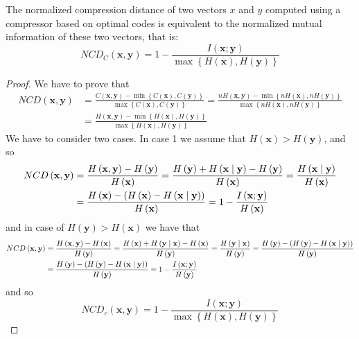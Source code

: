 \begin{proposition}
The normalized compression distance of two vectors $x$ and $y$ computed using a compressor based on optimal codes is equivalent to the normalized mutual information of these two vectors, that is:
\[
NCD_C\left(\mathbf{x},\mathbf{y}\right)=1-\frac{I\left(\mathbf{x};\mathbf{y}\right)}{\max\left\{ H\left(\mathbf{x}\right),H\left(\mathbf{y}\right)\right\} }
\]
\end{proposition}
\begin{proof}
We have to prove that
\begin{align*}
NCD\left(\mathbf{x},\mathbf{y}\right) & = \frac{C\left(\mathbf{x},\mathbf{y}\right)-\min\left\{ C\left(\mathbf{x}\right),C\left(\mathbf{y}\right)\right\} }{\max\left\{ C\left(\mathbf{x}\right),C\left(\mathbf{y}\right)\right\} } =\frac{nH\left(\mathbf{x},\mathbf{y}\right)-\min\left\{ nH\left(\mathbf{x}\right),nH\left(\mathbf{y}\right)\right\} }{\max\left\{ nH\left(\mathbf{x}\right),nH\left(\mathbf{y}\right)\right\} } \\
& =\frac{H\left(\mathbf{x},\mathbf{y}\right)-\min\left\{ H\left(\mathbf{x}\right),H\left(\mathbf{y}\right)\right\} }{\max\left\{ H\left(\mathbf{x}\right),H\left(\mathbf{y}\right)\right\} }
\end{align*}
We have to consider two cases. In case 1 we assume that $H\left(\mathbf{x}\right)>H\left(\mathbf{y}\right)$, and so
\begin{align*}
NCD\left(\mathbf{x},\mathbf{y}\right) & = \frac{H\left(\mathbf{x},\mathbf{y}\right)-H\left(\mathbf{y}\right)}{H\left(\mathbf{x}\right)} = \frac{H\left(\mathbf{y}\right)+H\left(\mathbf{x}\mid\mathbf{y}\right)-H\left(\mathbf{y}\right)}{H\left(\mathbf{x}\right)} = \frac{H\left(\mathbf{x}\mid\mathbf{y}\right)}{H\left(\mathbf{x}\right)} \\
& = \frac{H\left(\mathbf{x}\right)-\left(H\left(\mathbf{x}\right)-H\left(\mathbf{x}\mid\mathbf{y}\right)\right)}{H\left(\mathbf{x}\right)} = 1-\frac{I\left(\mathbf{x};\mathbf{y}\right)}{H\left(\text{\ensuremath{\mathbf{x}}}\right)}
\end{align*}
and in case of $H\left(\mathbf{y}\right)>H\left(\mathbf{x}\right)$ we have that
\begin{align*}
NCD\left(\mathbf{x},\mathbf{y}\right) & = \frac{H\left(\mathbf{x},\mathbf{y}\right)-H\left(\mathbf{x}\right)}{H\left(\mathbf{y}\right)} =\frac{H\left(\mathbf{x}\right)+H\left(\mathbf{y}\mid\mathbf{x}\right)-H\left(\mathbf{x}\right)}{H\left(\mathbf{y}\right)} = \frac{H\left(\mathbf{y}\mid\mathbf{x}\right)}{H\left(\mathbf{y}\right)}=\frac{H\left(\mathbf{y}\right)-\left(H\left(\mathbf{y}\right)-H\left(\mathbf{x}\mid\mathbf{y}\right)\right)}{H\left(\mathbf{y}\right)} \\
& = \frac{H\left(\mathbf{y}\right)-\left(H\left(\mathbf{y}\right)-H\left(\mathbf{x}\mid\mathbf{y}\right)\right)}{H\left(\mathbf{y}\right)} = 1-\frac{I\left(\mathbf{x};\mathbf{y}\right)}{H\left(\text{\ensuremath{\mathbf{y}}}\right)}
\end{align*}
and so
\[
NCD_c\left(\mathbf{x},\mathbf{y}\right)=1-\frac{I\left(\mathbf{x};\mathbf{y}\right)}{\max\left\{ H\left(\mathbf{x}\right),H\left(\mathbf{y}\right)\right\} }
\]
\end{proof}

